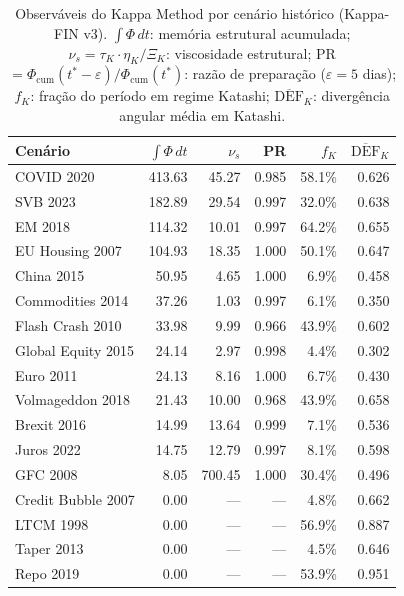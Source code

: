 \begin{table}[htbp]
\centering
\small
\begin{tabular}{lrrrrr}
\toprule
Cenário & $\int\Phi\,dt$ & $\nu_s$ & PR & $f_K$ & $\overline{\mathrm{DEF}}_K$ \\
\midrule
  COVID 2020 & 413.63 & 45.27 & 0.985 & 58.1\% & 0.626 \\
  SVB 2023 & 182.89 & 29.54 & 0.997 & 32.0\% & 0.638 \\
  EM 2018 & 114.32 & 10.01 & 0.997 & 64.2\% & 0.655 \\
  EU Housing 2007 & 104.93 & 18.35 & 1.000 & 50.1\% & 0.647 \\
  China 2015 & 50.95 & 4.65 & 1.000 & 6.9\% & 0.458 \\
  Commodities 2014 & 37.26 & 1.03 & 0.997 & 6.1\% & 0.350 \\
  Flash Crash 2010 & 33.98 & 9.99 & 0.966 & 43.9\% & 0.602 \\
  Global Equity 2015 & 24.14 & 2.97 & 0.998 & 4.4\% & 0.302 \\
  Euro 2011 & 24.13 & 8.16 & 1.000 & 6.7\% & 0.430 \\
  Volmageddon 2018 & 21.43 & 10.00 & 0.968 & 43.9\% & 0.658 \\
  Brexit 2016 & 14.99 & 13.64 & 0.999 & 7.1\% & 0.536 \\
  Juros 2022 & 14.75 & 12.79 & 0.997 & 8.1\% & 0.598 \\
  GFC 2008 & 8.05 & 700.45 & 1.000 & 30.4\% & 0.496 \\
  Credit Bubble 2007 & 0.00 & --- & --- & 4.8\% & 0.662 \\
  LTCM 1998 & 0.00 & --- & --- & 56.9\% & 0.887 \\
  Taper 2013 & 0.00 & --- & --- & 4.5\% & 0.646 \\
  Repo 2019 & 0.00 & --- & --- & 53.9\% & 0.951 \\
\bottomrule
\end{tabular}
\caption{Observ\'aveis do Kappa Method por cen\'ario hist\'orico (Kappa-FIN v3). $\int\Phi\,dt$: mem\'oria estrutural acumulada; $\nu_s = \tau_K \cdot \eta_K / \Xi_K$: viscosidade estrutural; PR $= \Phi_{\text{cum}}(t^*-\varepsilon)/\Phi_{\text{cum}}(t^*)$: raz\~ao de prepara\c{c}\~ao ($\varepsilon=5$ dias); $f_K$: fra\c{c}\~ao do per\'iodo em regime Katashi; $\overline{\mathrm{DEF}}_K$: diverg\^encia angular m\'edia em Katashi.}
\label{tab:kappa_scenarios}
\end{table}